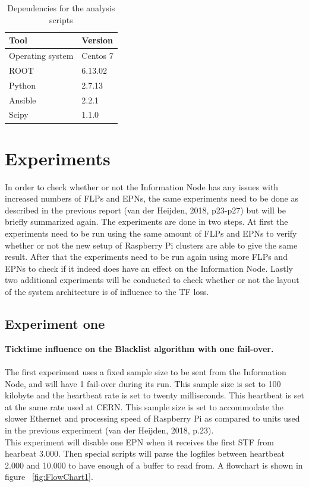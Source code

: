 \begin{table}[ht]
\begin{tabular}{| l | l |}
\hline
Tool & Version \\ \hline
Operating system & Centos 7 \\ \hline
ROOT & 6.13.02 \\ \hline
Python & 2.7.13 \\ \hline
Ansible & 2.2.1 \\ \hline
Scipy & 1.1.0 \\ \hline
\end{tabular}
\caption{Dependencies for the analysis scripts}
\label{table:AnalysisDependencies}
\end{table}

\newpage

\section{Experiments}
In order to check whether or not the Information Node has any issues with increased numbers of FLPs and EPNs, the same experiments need to be done as described in the previous report (van der Heijden, 2018, p23-p27) but will be briefly summarized again. The experiments are done in two steps. At first the experiments need to be run using the same amount of FLPs and EPNs to verify whether or not the new setup of Raspberry Pi clusters are able to give the same result. After that the experiments need to be run again using more FLPs and EPNs to check if it indeed does have an effect on the Information Node. Lastly two additional experiments will be conducted to check whether or not the layout of the system architecture is of influence to the TF loss.

\subsection{Experiment one}
\textbf{Ticktime influence on the Blacklist algorithm with one fail-over.}
\\~\\
The first experiment uses a fixed sample size to be sent from the Information Node, and will have 1 fail-over during its run. This sample size is set to 100 kilobyte and the heartbeat rate is set to twenty milliseconds. This heartbeat is set at the same rate used at CERN. This sample size is set to accommodate the slower Ethernet and processing speed of Raspberry Pi as compared to units used in the previous experiment (van der Heijden, 2018, p.23). \\
This experiment will disable one EPN when it receives the first STF from hearbeat 3.000. Then special scripts will parse the logfiles between heartbeat 2.000 and 10.000 to have enough of a buffer to read from. A flowchart is shown in figure ~\ref{fig:FlowChart1}.

